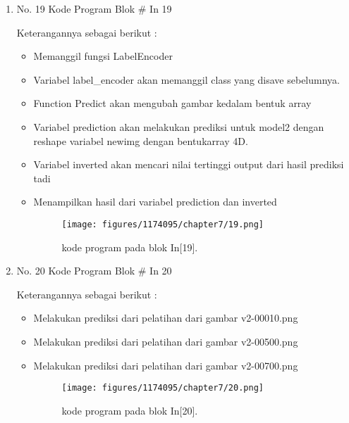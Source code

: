 \begin{enumerate}
\item No. 19 Kode Program Blok \# In 19
\par 
Keterangannya sebagai berikut :
\begin{itemize}
\item Memanggil fungsi LabelEncoder
\item Variabel label\_encoder akan memanggil class yang disave sebelumnya.
\item Function Predict akan mengubah gambar kedalam bentuk array
\item Variabel prediction akan melakukan prediksi untuk model2 dengan reshape variabel newimg dengan bentukarray 4D.
\item Variabel inverted akan mencari nilai tertinggi output dari hasil prediksi tadi
\item Menampilkan hasil dari variabel prediction dan inverted
\begin{figure}[H]
    \texttt{[image: figures/1174095/chapter7/19.png]}
    \centering
    \caption{kode program pada blok  In[19].}
    \end{figure}
\end{itemize}

\item No. 20 Kode Program Blok \# In 20
\par 
Keterangannya sebagai berikut :
\begin{itemize}
\item Melakukan prediksi dari pelatihan dari gambar v2-00010.png
\item Melakukan prediksi dari pelatihan dari gambar v2-00500.png
\item Melakukan prediksi dari pelatihan dari gambar v2-00700.png
\begin{figure}[H]
    \texttt{[image: figures/1174095/chapter7/20.png]}
    \centering
    \caption{kode program pada blok  In[20].}
    \end{figure}
\end{itemize}

\end{enumerate}